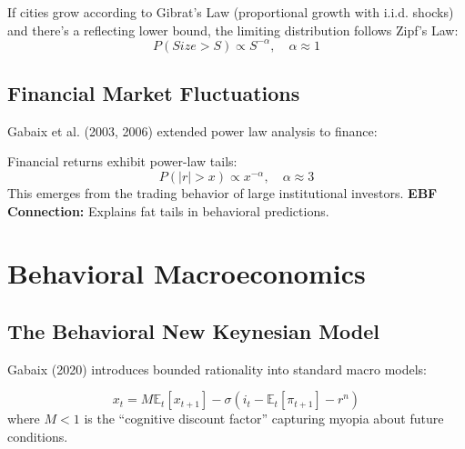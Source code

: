 \begin{theorem}
If cities grow according to Gibrat's Law (proportional growth with i.i.d. shocks) and there's a reflecting lower bound, the limiting distribution follows Zipf's Law:
\begin{equation}
P(Size > S) \propto S^{-\alpha}, \quad \alpha \approx 1
\end{equation}
\end{theorem}

\subsection{Financial Market Fluctuations}

Gabaix et al. (2003, 2006) extended power law analysis to finance:

\begin{axiom}
\label{ax:xg4}
Financial returns exhibit power-law tails:
\begin{equation}
P(|r| > x) \propto x^{-\alpha}, \quad \alpha \approx 3
\end{equation}
This emerges from the trading behavior of large institutional investors.
\textbf{EBF Connection:} Explains fat tails in behavioral predictions.
\end{axiom}

\section{Behavioral Macroeconomics}

\subsection{The Behavioral New Keynesian Model}

Gabaix (2020) introduces bounded rationality into standard macro models:

\begin{definition}
\begin{equation}
x_t = M \mathbb{E}_t[x_{t+1}] - \sigma(i_t - \mathbb{E}_t[\pi_{t+1}] - r^n)
\end{equation}
where $M < 1$ is the ``cognitive discount factor'' capturing myopia about future conditions.
\end{definition}

